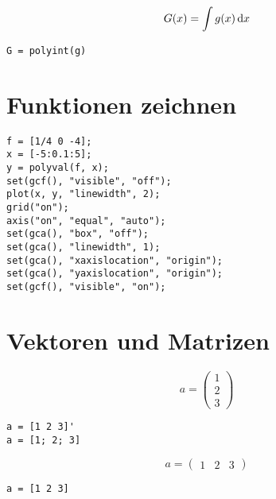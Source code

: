 \documentclass
[
  fontsize = 11pt,
  parskip  = half-,
  BCOR     = 0pt,
  DIV      = 11,
  ngerman
]
{scrartcl}
\begin{document}
\begin{minipage}{\mw}
  \begin{equation*}
    \vphantom{\bigg(}%
    G(x)=\int g(x)\,\mathrm{d}x
  \end{equation*}
\end{minipage}%
\hfill
\begin{minipage}{\cw}
\begin{verbatim}
G = polyint(g)
\end{verbatim}
\end{minipage}

\section{Funktionen zeichnen}
\begin{verbatim}
f = [1/4 0 -4];
x = [-5:0.1:5];
y = polyval(f, x);
set(gcf(), "visible", "off");
plot(x, y, "linewidth", 2);
grid("on");
axis("on", "equal", "auto");
set(gca(), "box", "off");
set(gca(), "linewidth", 1);
set(gca(), "xaxislocation", "origin");
set(gca(), "yaxislocation", "origin");
set(gcf(), "visible", "on");
\end{verbatim}

\section{Vektoren und Matrizen}
\begin{minipage}{\mw}
  \begin{equation*}
    a=\begin{pmatrix}
        1 \\ 2 \\ 3
      \end{pmatrix}
  \end{equation*}
\end{minipage}%
\hfill
\begin{minipage}{\cw}
\begin{verbatim}
a = [1 2 3]'
a = [1; 2; 3]
\end{verbatim}
\end{minipage}\bigskip

\begin{minipage}{\mw}
  \begin{equation*}
    a=\begin{pmatrix}
        1 & 2 & 3
      \end{pmatrix}
  \end{equation*}
\end{minipage}%
\hfill
\begin{minipage}{\cw}
\begin{verbatim}
a = [1 2 3]
\end{verbatim}
\end{minipage}\bigskip
\end{document}
